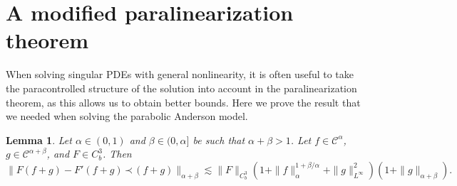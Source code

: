 \documentclass[a4paper,11pt]{article}
\newtheorem{lemma}[theorem]{Lemma}
\theoremstyle{remark}
\newcommand{\CC}{\ensuremath{\mathscr{C}}}
\newcommand{\lpara}{\,\mathord{\prec}\,}
\begin{document}
\section{A modified paralinearization theorem}\label{sec:paralin mod}

When solving singular PDEs with general nonlinearity, it is often useful to take the paracontrolled structure of the solution into account in the paralinearization theorem, as this allows us to obtain better bounds. Here we prove the result that we needed when solving the parabolic Anderson model.

\begin{lemma}\label{lem:mod paralin}
   Let $\alpha \in (0,1)$ and $\beta \in (0,\alpha]$ be such that $\alpha + \beta > 1$. Let $f \in \CC^\alpha$, $g \in \CC^{\alpha+\beta}$, and $F \in C^{3}_b$. Then
   \begin{equation}\label{eq:mod paralin 2}
      \| F(f+g) - F'(f+g)\lpara (f+g) \|_{\alpha+\beta} \lesssim \| F\|_{C^3_b} (1 + \|f \|_\alpha^{1+\beta/\alpha} + \| g \|_{L^\infty}^2)(1 + \| g \|_{\alpha+\beta}).
   \end{equation}
\end{lemma}
\end{document}
